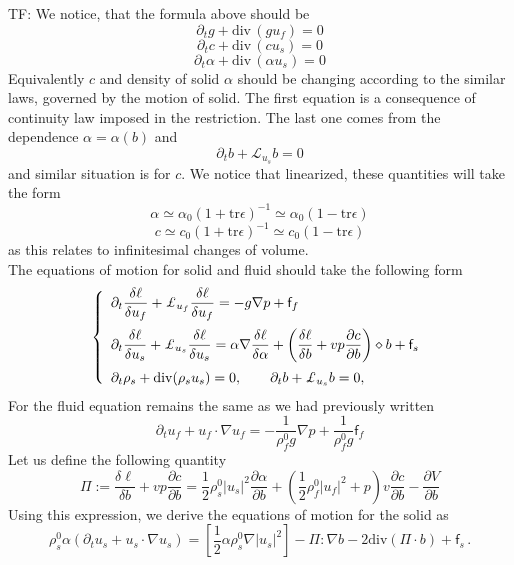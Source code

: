 \documentclass[12pt]{article}
\numberwithin{theorem}{section}
\def\div{\mbox{div}\,}
\newcommand{\pp}[2]{\frac{\partial #1}{\partial #2}}
\newcommand{\dede}[2]{\frac{\delta #1}{\delta #2}}
\newcommand{\tr}{\mbox{tr}}
\begin{document}
TF: We notice, that the formula above should be 
\[\partial_t g + \div(gu_f) = 0\]
\[\partial_t c + \div(cu_s) = 0\]
\[\partial_t \alpha + \div(\alpha u_s) = 0\]
Equivalently $c$ and density of solid $\alpha$ should be changing according to the similar laws, governed by the motion of solid.
The first equation is a consequence of continuity law imposed in the restriction.
The last one comes from the dependence $\alpha = \alpha(b)$ and
\[\partial_t b + \mathcal{L}_{u_s} b = 0\] and similar situation is for $c.$
We notice that linearized, these quantities will take the form
\[\alpha \simeq \alpha_0(1 + \tr \epsilon)^{-1} \simeq \alpha_0 (1 - \tr \epsilon)\]
\[c \simeq c_0(1 + \tr \epsilon)^{-1} \simeq c_0 (1 - \tr \epsilon)\]
as this relates to infinitesimal changes of volume.
\\
The equations of motion for solid and fluid should take the following form
\[
\left\{
\begin{array}{l}
\displaystyle\vspace{0.2cm}\partial_t\frac{\delta\ell}{\delta u_f}+ \pounds_{u_f} \frac{\delta\ell}{\delta u_f} = - g \nabla p + \mathsf{f}_f\\
\displaystyle\vspace{0.2cm}\partial_t\frac{\delta\ell}{\delta u_s}+ \pounds_{u_s} \frac{\delta\ell}{\delta u_s} = \alpha\nabla \frac{\delta\ell}{\delta \alpha} + \left(\frac{\delta\ell}{\delta b}+ vp \frac{\partial c}{\partial b}\right)\diamond b+ \mathsf{f}_s\\
\displaystyle\partial_t\rho_s+\operatorname{div}(\rho_su_s)=0,\qquad \partial_tb+ \pounds_{u_s}b=0,
\end{array}\right.
\]
For the fluid equation remains the same as we had previously written
\begin{equation} 
\partial_t u_f  + u_f \cdot \nabla u_f =   -\frac{1}{\rho_f^0 g} \nabla p  + \frac{1}{\rho_f^0 g} \mathsf{f}_f 
\end{equation}
Let us define the following quantity 
\begin{equation} 
\label{delta_l_b} 
\Pi := \dede{\ell}{b} + vp\pp{c}{b} = \frac{1}{2} \rho_s^0  |u_s|^2 \pp{\alpha}{b} +\left(  \frac{1}{2} \rho_f^0  |u_f|^2 + p \right)v \pp{c}{b} -\pp{V}{b} 
\end{equation} 
Using this expression, we derive the equations of motion for the solid as 
\begin{equation} 
\rho_s^0 \alpha \left( \partial_t u_s + u_s \cdot \nabla u_s \right) =   [\frac{1}{2}\alpha \rho_s^0 \nabla |u_s|^2]  -\Pi : \nabla b -2  \mbox{div} (\Pi \cdot b) + \mathsf{f}_s \,. 
\label{solid_eq_0}
\end{equation} 
\end{document}
